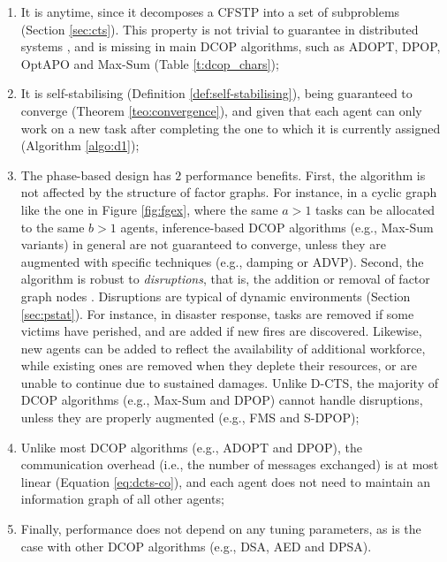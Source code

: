 \begin{enumerate}
    \item
        It is anytime, since it decomposes a CFSTP into a set of subproblems (Section
        \ref{sec:cts}). This property is not trivial to guarantee in distributed systems
        \cite{zivan2014}, and is missing in main DCOP algorithms, such as ADOPT, DPOP,
        OptAPO and Max-Sum (Table \ref{t:dcop_chars});
    \item
        It is self-stabilising (Definition \ref{def:self-stabilising}), being guaranteed
        to converge (Theorem \ref{teo:convergence}), and given that each agent can only
        work on a new task after completing the one to which it is currently assigned
        (Algorithm \ref{algo:d1});
    \item
        The phase-based design has $2$ performance benefits. First, the algorithm is not
        affected by the structure of factor graphs. For instance, in a cyclic graph like
        the one in Figure \ref{fig:fgex}, where the same $a > 1$ tasks can be allocated to
        the same $b > 1$ agents, inference-based DCOP algorithms (e.g., Max-Sum variants)
        in general are not guaranteed to converge, unless they are augmented with specific
        techniques (e.g., damping or ADVP). Second, the algorithm is robust to
        \emph{disruptions}, that is, the addition or removal of factor graph nodes
        \cite[Section $6.2$]{ramchurn2010fms}. Disruptions are typical of dynamic
        environments (Section \ref{sec:pstat}). For instance, in disaster response, tasks
        are removed if some victims have perished, and are added if new fires are
        discovered. Likewise, new agents can be added to reflect the availability of
        additional workforce, while existing ones are removed when they deplete their
        resources, or are unable to continue due to sustained damages. Unlike D-CTS, the
        majority of DCOP algorithms (e.g., Max-Sum and DPOP) cannot handle disruptions,
        unless they are properly augmented (e.g., FMS and S-DPOP);
    \item
        Unlike most DCOP algorithms (e.g., ADOPT and DPOP), the communication overhead
        (i.e., the number of messages exchanged) is at most linear (Equation
        \ref{eq:dcts-co}), and each agent does not need to maintain an information graph
        of all other agents;
    \item
        Finally, performance does not depend on any tuning parameters, as is the case with
        other DCOP algorithms (e.g., DSA, AED and DPSA).
\end{enumerate}
